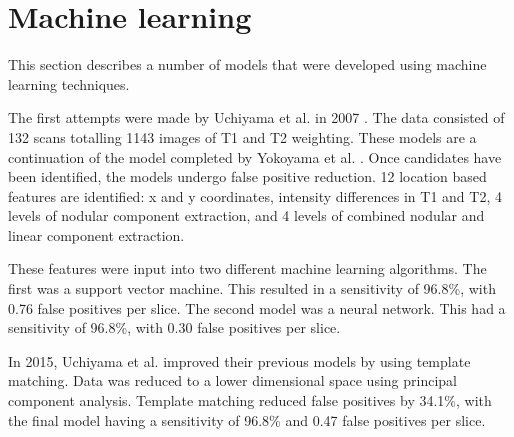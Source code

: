 \section{Machine learning}\label{litrev-ml}

This section describes a number of models that were developed using machine learning techniques. 

The first attempts were made by Uchiyama et al. in 2007 \cite{Uchiyama20071554, Uchiyama2007b}. The data consisted of 132 scans totalling 1143 images of T1 and T2 weighting. These models are a continuation of the model completed by Yokoyama et al. \cite{Yokoyama2007}. Once candidates have been identified, the models undergo false positive reduction. 12 location based features are identified: x and y coordinates, intensity differences in T1 and T2, 4 levels of nodular component extraction, and 4 levels of combined nodular and linear component extraction.

These features were input into two different machine learning algorithms. The first was a support vector machine. This resulted in a sensitivity of 96.8\%, with 0.76 false positives per slice. The second model was a neural network. This had a sensitivity of 96.8\%, with 0.30 false positives per slice.

In 2015, Uchiyama et al. \cite{Uchiyama2015} improved their previous models by using template matching. Data was reduced to a lower dimensional space using principal component analysis. Template matching reduced false positives by 34.1\%, with the final model having a sensitivity of 96.8\% and 0.47 false positives per slice.





